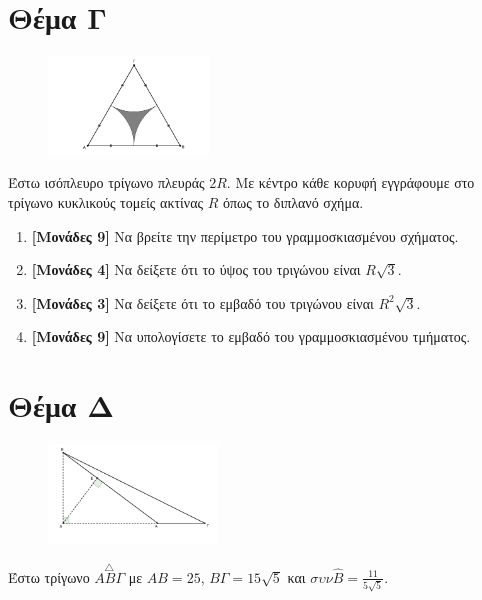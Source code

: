 \documentclass[12pt]{article}
\begin{document}
\section*{Θέμα Γ}
  \noindent
  \begin{figure}
    \centering
    \vspace{-50pt}
    \includegraphics[width=0.38\textwidth]{2017BGeo3}
  \end{figure}

  Έστω ισόπλευρο τρίγωνο πλευράς $2R$. Με κέντρο κάθε κορυφή εγγράφουμε στο τρίγωνο κυκλικούς τομείς ακτίνας $R$ όπως το διπλανό σχήμα.
  \begin{enumerate}
    \item \textbf{[Μονάδες 9]}  Να βρείτε την περίμετρο του γραμμοσκιασμένου σχήματος.
    \item \textbf{[Μονάδες 4]}  Να δείξετε ότι το ύψος του τριγώνου είναι $R\sqrt{3}$.
    \item \textbf{[Μονάδες 3]}  Να δείξετε ότι το εμβαδό του τριγώνου είναι $R^2\sqrt{3}$.
    \item \textbf{[Μονάδες 9]}  Να υπολογίσετε το εμβαδό του γραμμοσκιασμένου τμήματος.
  \end{enumerate}

\section*{Θέμα Δ}
  \noindent
  \begin{figure}
    \centering
    \vspace{-50pt}
    \includegraphics[width=0.4\textwidth]{2017BGeo4}
  \end{figure}

  Έστω τρίγωνο $\overset{\triangle}{ΑΒΓ}$ με $ΑΒ=25$, $ΒΓ=15\sqrt{5}$ και $συν\hat{Β}=\frac{11}{5\sqrt{5}}$.
\end{document}
